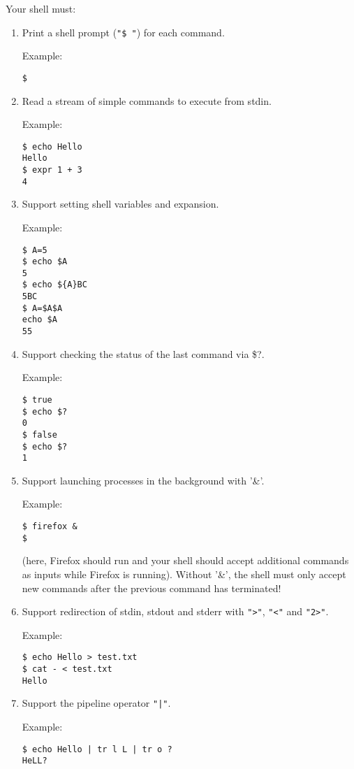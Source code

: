 \documentclass{scrartcl}
\begin{document}
Your shell must:
\begin{enumerate}
\item  Print a shell prompt (\texttt{"\$ "}) for each command.

Example:

\begin{lstlisting}
$
\end{lstlisting}


\item  Read a stream of simple commands to execute from stdin.

Example:

\begin{lstlisting}
$ echo Hello
Hello
$ expr 1 + 3
4
\end{lstlisting}


\item  Support setting shell variables and expansion.

Example:

\begin{lstlisting}
$ A=5
$ echo $A
5
$ echo ${A}BC
5BC
$ A=$A$A
echo $A
55
\end{lstlisting}%



\item  Support checking the status of the last command via \$?.

Example:
\begin{lstlisting}
$ true
$ echo $?
0
$ false
$ echo $?
1
\end{lstlisting}



\item  Support launching processes in the background with '\&'.

  Example:

  \begin{lstlisting}
$ firefox &
$
\end{lstlisting}


(here, Firefox should run and your shell should accept additional
commands as inputs while Firefox is running).  Without '\&', the
shell must only accept new commands after the previous command
has terminated!


\item Support redirection of stdin, stdout and stderr with \texttt{">"}, \texttt{"<"} and \texttt{"2>"}.

  Example:


  \begin{lstlisting}
$ echo Hello > test.txt
$ cat - < test.txt
Hello
\end{lstlisting}

\item  Support the pipeline operator \texttt{"|"}.

  Example:

  \begin{lstlisting}
$ echo Hello | tr l L | tr o ?
HeLL?
\end{lstlisting}%
\end{enumerate}
\end{document}
